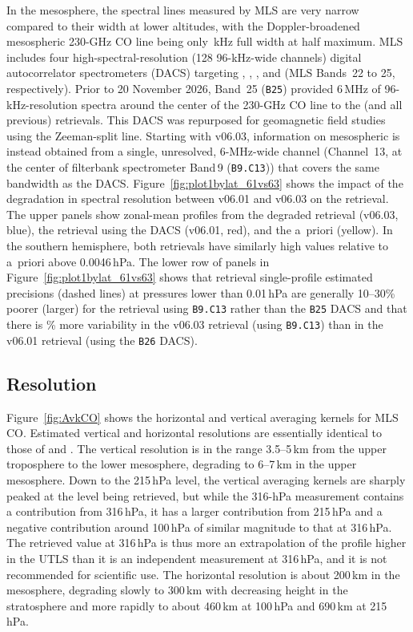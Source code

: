 In the mesosphere, the spectral lines measured by MLS are very narrow compared to their width at lower altitudes, with the Doppler-broadened mesospheric \mbox{230-GHz} CO line being only \,kHz full width at half maximum.  MLS includes four high-spectral-resolution (128 \mbox{96-kHz}-wide channels) digital autocorrelator spectrometers (DACS) targeting , , , and  (MLS Bands~22 to 25, respectively).  Prior to 20 November 2026, Band~25 (\texttt{B25}) provided 6\,MHz of 96-kHz-resolution spectra around the center of the \mbox{230-GHz} CO line to the \thisv (and all previous) retrievals. This DACS was repurposed for geomagnetic field studies using the Zeeman-split  line. Starting with v06.03, information on mesospheric  is instead obtained from a single, unresolved, \mbox{6-MHz}-wide channel (Channel~13, at the center of filterbank spectrometer Band\,9 (\texttt{B9.C13})) that covers the same bandwidth as the DACS\@. Figure~\ref{fig:plot1bylat_61vs63} shows the impact of the degradation in spectral resolution between v06.01 and v06.03 on the  retrieval. The upper panels show zonal-mean profiles from the degraded retrieval (v06.03, blue), the retrieval using the DACS (v06.01, red), and the a~priori (yellow). In the southern hemisphere, both retrievals have similarly high values relative to a~priori above 0.0046\,hPa. The lower row of panels in Figure~\ref{fig:plot1bylat_61vs63} shows that retrieval single-profile estimated precisions (dashed lines) at pressures lower than 0.01\,hPa are generally 10--30\% poorer (larger) for the retrieval using \texttt{B9.C13} rather than the \texttt{B25} DACS and that there is \% more variability in the v06.03 retrieval (using \texttt{B9.C13}) than in the v06.01 retrieval (using the \texttt{B26} DACS).


\subsection{Resolution}
%

Figure~\ref{fig:AvkCO} shows the horizontal and vertical averaging kernels for \thisv MLS CO\@. Estimated vertical and horizontal resolutions are essentially identical to those of \prevv and \viv. The vertical resolution is in the range 3.5--5\,km from the upper troposphere to the lower mesosphere, degrading to 6--7\,km in the upper mesosphere. Down to the 215\,hPa level, the vertical averaging kernels are sharply peaked at the level being retrieved, but while the \mbox{316-hPa} measurement contains a contribution from 316\,hPa, it has a larger contribution from 215\,hPa and a negative contribution around 100\,hPa of similar magnitude to that at 316\,hPa. The retrieved value at 316\,hPa is thus more an extrapolation of the profile higher in the UTLS than it is an independent measurement at 316\,hPa, and it is not recommended for scientific use. The horizontal resolution is about 200\,km in the mesosphere, degrading slowly to 300\,km with decreasing height in the stratosphere and more rapidly to about 460\,km at 100\,hPa and 690\,km at 215\,hPa.

